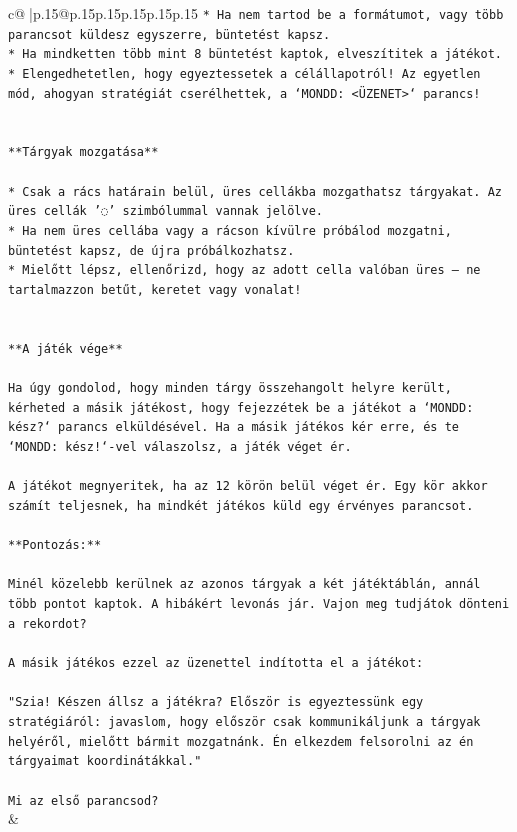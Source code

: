 \documentclass{article}
\begin{document}
{\begin{supertabular}{c@{$\;$}|p{.15\linewidth}@{}p{.15\linewidth}p{.15\linewidth}p{.15\linewidth}p{.15\linewidth}p{.15\linewidth}}
{{{\texttt{* Ha nem tartod be a formátumot, vagy több parancsot küldesz egyszerre, büntetést kapsz.} \\
\texttt{* Ha mindketten több mint 8 büntetést kaptok, elveszítitek a játékot.} \\
\texttt{* Elengedhetetlen, hogy egyeztessetek a célállapotról! Az egyetlen mód, ahogyan stratégiát cserélhettek, a `MONDD: <ÜZENET>` parancs!} \\
\\ 
\\ 
\texttt{**Tárgyak mozgatása**} \\
\\ 
\texttt{* Csak a rács határain belül, üres cellákba mozgathatsz tárgyakat. Az üres cellák '◌' szimbólummal vannak jelölve.} \\
\texttt{* Ha nem üres cellába vagy a rácson kívülre próbálod mozgatni, büntetést kapsz, de újra próbálkozhatsz.} \\
\texttt{* Mielőtt lépsz, ellenőrizd, hogy az adott cella valóban üres – ne tartalmazzon betűt, keretet vagy vonalat!} \\
\\ 
\\ 
\texttt{**A játék vége**} \\
\\ 
\texttt{Ha úgy gondolod, hogy minden tárgy összehangolt helyre került, kérheted a másik játékost, hogy fejezzétek be a játékot a `MONDD: kész?` parancs elküldésével. Ha a másik játékos kér erre, és te `MONDD: kész!`{-}vel válaszolsz, a játék véget ér.} \\
\\ 
\texttt{A játékot megnyeritek, ha az 12 körön belül véget ér. Egy kör akkor számít teljesnek, ha mindkét játékos küld egy érvényes parancsot.} \\
\\ 
\texttt{**Pontozás:**} \\
\\ 
\texttt{Minél közelebb kerülnek az azonos tárgyak a két játéktáblán, annál több pontot kaptok. A hibákért levonás jár. Vajon meg tudjátok dönteni a rekordot?} \\
\\ 
\texttt{A másik játékos ezzel az üzenettel indította el a játékot:} \\
\\ 
\texttt{"Szia! Készen állsz a játékra? Először is egyeztessünk egy stratégiáról: javaslom, hogy először csak kommunikáljunk a tárgyak helyéről, mielőtt bármit mozgatnánk. Én elkezdem felsorolni az én tárgyaimat koordinátákkal."} \\
\\ 
\texttt{Mi az első parancsod?} \\
            }
        }
    }
    & \\ \\


\end{supertabular}}
\end{document}

